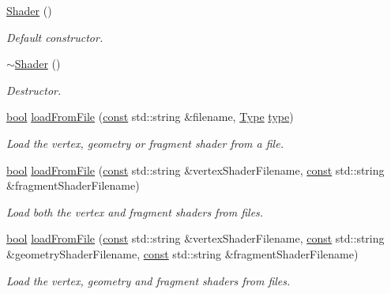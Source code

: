 \begin{DoxyCompactItemize}
\hyperlink{classsf_1_1_shader_a1d7f28f26b4122959fcafec871c2c3c5}{Shader} ()
\begin{DoxyCompactList}\small\item\em Default constructor. \end{DoxyCompactList}\item 
\hyperlink{classsf_1_1_shader_a4bac6cc8b046ecd8fb967c145a2380e6}{$\sim$\-Shader} ()
\begin{DoxyCompactList}\small\item\em Destructor. \end{DoxyCompactList}\item 
\hyperlink{term__entry_8h_a002004ba5d663f149f6c38064926abac}{bool} \hyperlink{classsf_1_1_shader_a053a5632848ebaca2fcd8ba29abe9e6e}{load\-From\-File} (\hyperlink{term__entry_8h_a57bd63ce7f9a353488880e3de6692d5a}{const} std\-::string \&filename, \hyperlink{classsf_1_1_shader_afaa1aa65e5de37b74d047da9def9f9b3}{Type} \hyperlink{_entity_8cpp_aa209819775142a76b8e49319d79ecab2}{type})
\begin{DoxyCompactList}\small\item\em Load the vertex, geometry or fragment shader from a file. \end{DoxyCompactList}\item 
\hyperlink{term__entry_8h_a002004ba5d663f149f6c38064926abac}{bool} \hyperlink{classsf_1_1_shader_ac9d7289966fcef562eeb92271c03e3dc}{load\-From\-File} (\hyperlink{term__entry_8h_a57bd63ce7f9a353488880e3de6692d5a}{const} std\-::string \&vertex\-Shader\-Filename, \hyperlink{term__entry_8h_a57bd63ce7f9a353488880e3de6692d5a}{const} std\-::string \&fragment\-Shader\-Filename)
\begin{DoxyCompactList}\small\item\em Load both the vertex and fragment shaders from files. \end{DoxyCompactList}\item 
\hyperlink{term__entry_8h_a002004ba5d663f149f6c38064926abac}{bool} \hyperlink{classsf_1_1_shader_a295d8468811ca15bf9c5401a7a7d4f54}{load\-From\-File} (\hyperlink{term__entry_8h_a57bd63ce7f9a353488880e3de6692d5a}{const} std\-::string \&vertex\-Shader\-Filename, \hyperlink{term__entry_8h_a57bd63ce7f9a353488880e3de6692d5a}{const} std\-::string \&geometry\-Shader\-Filename, \hyperlink{term__entry_8h_a57bd63ce7f9a353488880e3de6692d5a}{const} std\-::string \&fragment\-Shader\-Filename)
\begin{DoxyCompactList}\small\item\em Load the vertex, geometry and fragment shaders from files. \end{DoxyCompactList}\item 

\end{DoxyCompactItemize}
